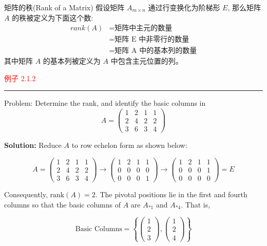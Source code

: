 \documentclass[10pt, a4paper]{article}
\begin{document}
\begin{bluebox}{矩阵的秩(Rank of a Matrix)}
假设矩阵 \(A_{m \times n}\) 通过行变换化为阶梯形 \(E\), 那么矩阵 \(A\) 的秩被定义为下面这个数:
\[
\begin{aligned} 
rank(A) & = \text{矩阵中主元的数量} \\ 
& = \text{矩阵 E 中非零行的数量} \\ 
& = \text{矩阵 A 中的基本列的数量} 
\end{aligned}
\]
其中矩阵 \(A\) 的基本列被定义为 \(A\) 中包含主元位置的列。
\end{bluebox}
 
\textcolor{red}{例子 2.1.2}
\color{red}\rule{\textwidth}{0.4pt}\color{black}

Problem: Determine the rank, and identify the basic columns in
\[
A = 
\begin{pmatrix}
1 & 2 & 1 & 1 \\
2 & 4 & 2 & 2 \\
3 & 6 & 3 & 4
\end{pmatrix}
\]

\textbf{Solution:} Reduce \( A \) to row echelon form as shown below:

\[
A = 
\begin{pmatrix}
1 & 2 & 1 & 1 \\
2 & 4 & 2 & 2 \\
3 & 6 & 3 & 4
\end{pmatrix}
\rightarrow
\begin{pmatrix}
1 & 2 & 1 & 1 \\
0 & 0 & 0 & 0 \\
0 & 0 & 0 & 1
\end{pmatrix}
\rightarrow
\begin{pmatrix}
1 & 2 & 1 & 1 \\
0 & 0 & 0 & 1 \\
0 & 0 & 0 & 0
\end{pmatrix}
= E
\]

Consequently, \( \text{rank}(A) = 2 \). The pivotal positions lie in the first and fourth columns so that the basic columns of \( A \) are \( A_{*1} \) and \( A_{*4} \). That is,

\[
\text{Basic Columns} = 
\left\{ 
\begin{pmatrix}
1 \\
2 \\
3
\end{pmatrix},
\begin{pmatrix}
1 \\
2 \\
4
\end{pmatrix}
\right\}
\]
\end{document}
